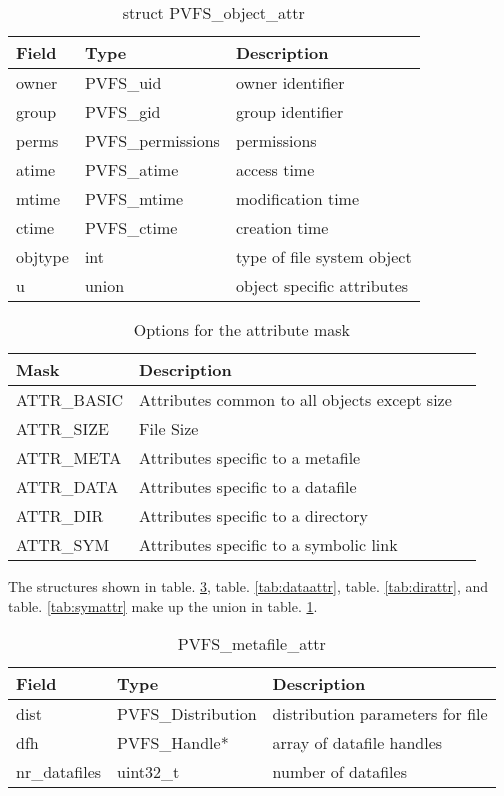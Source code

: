 \documentclass[11pt, letterpaper]{article}
\begin{document}
\begin{table}[H]
\begin{tabular}{|l|l|l|}
\hline
Field & Type & Description \\
\hline
\hline
owner & PVFS\_uid & owner identifier \\
\hline
group & PVFS\_gid & group identifier \\
\hline
perms & PVFS\_permissions & permissions \\
\hline
atime & PVFS\_atime & access time \\ 
\hline
mtime & PVFS\_mtime & modification time \\
\hline
ctime & PVFS\_ctime & creation time \\
\hline
objtype & int & type of file system object \\
\hline
u & union & object specific attributes \\
\hline
\end{tabular}
\caption{struct PVFS\_object\_attr}\label{tab:objattr}
\end{table}

\begin{table}[H]
\begin{tabular}{|l|l|l|}
\hline
Mask & Description \\
\hline
\hline
ATTR\_BASIC & Attributes common to all objects except size \\
\hline
ATTR\_SIZE & File Size \\
\hline
ATTR\_META & Attributes specific to a metafile \\
\hline
ATTR\_DATA & Attributes specific to a datafile \\
\hline
ATTR\_DIR & Attributes specific to a directory \\
\hline
ATTR\_SYM & Attributes specific to a symbolic link \\
\hline
\end{tabular}
\caption{Options for the attribute mask}\label{tab:optattr}
\end{table}


The structures shown in table. \ref{tab:metaattr}, table. \ref{tab:dataattr},
table. \ref{tab:dirattr}, and table. \ref{tab:symattr} make up the union in
table. \ref{tab:objattr}.

\begin{table}[H]
\begin{tabular}{|l|l|l|}
\hline
Field & Type & Description \\
\hline
\hline
dist & PVFS\_Distribution & distribution parameters for file \\
\hline
dfh & PVFS\_Handle* & array of datafile handles \\
\hline
nr\_datafiles & uint32\_t & number of datafiles \\
\hline
\end{tabular}
\caption{PVFS\_metafile\_attr}\label{tab:metaattr}
\end{table}
\end{document}
